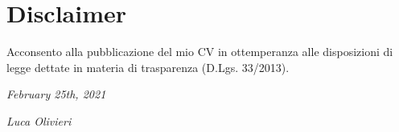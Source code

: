 \documentclass[]{friggeri-cv}
\begin{document}
\section{Disclaimer}
Acconsento alla pubblicazione del mio CV in ottemperanza alle disposizioni di legge dettate in materia di trasparenza (D.Lgs. 33/2013).

\begin{flushleft}
\emph{February 25th, 2021}
\end{flushleft}
\begin{flushright}
\emph{Luca Olivieri}
\end{flushright}

% 
\end{document}
